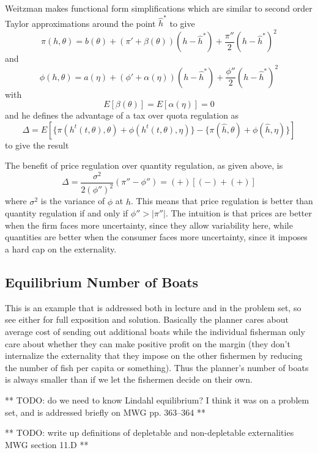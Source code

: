 Weitzman makes functional form simplifications which are similar to
second order Taylor approximations around the point $\hat h^*$ to give
\[
\pi(h, \theta) 
= b(\theta) + (\pi' + \beta(\theta))(h - \hat h^*) + \frac{\pi''}{2}(h - \hat h^*)^2
\]
and
\[
\phi(h, \theta) 
= a(\eta) + (\phi' + \alpha(\eta))(h - \hat h^*) + \frac{\phi''}{2}(h - \hat h^*)^2
\]
with
\[
E[\beta(\theta)] = E[\alpha(\eta)] = 0
\]
and he defines the advantage of a tax over quota regulation as
\[
\Delta 
= E[\{ \pi(h^t(t, \theta), \theta) + \phi(h^t(t, \theta), \eta) \}
- \{ \pi(\hat h, \theta) + \phi(\hat h, \eta) \} ]
\]
to give the result

\begin{prop}[Weitzman]
  The benefit of price regulation over quantity regulation, as given
  above, is
  \[
  \Delta = \frac{\sigma^2}{2(\phi'')^2}(\pi'' - \phi'') = (+)[(-) + (+)]
  \]
  where $\sigma^2$ is the variance of $\phi$ at $\hat h$. This means
  that price regulation is better than quantity regulation if and only
  if $\phi'' > |\pi''|$. The intuition is that prices are better when
  the firm faces more uncertainty, since they allow variability here,
  while quantities are better when the consumer faces more
  uncertainty, since it imposes a hard cap on the externality.
\end{prop}

\subsection{Equilibrium Number of Boats}
\label{sec:equil-numb-boats}

This is an example that is addressed both in lecture and in the
problem set, so see either for full exposition and solution. Basically
the planner cares about average cost of sending out additional boats
while the individual fisherman only care about whether they can make
positive profit on the margin (they don't internalize the externality
that they impose on the other fishermen by reducing the number of fish
per capita or something). Thus the planner's number of boats is always
smaller than if we let the fishermen decide on their own.



** TODO: do we need to know Lindahl equilibrium? I think it was on a problem set, and is addressed briefly on MWG pp. 363--364 **

** TODO: write up definitions of depletable and non-depletable externalities MWG section 11.D **




